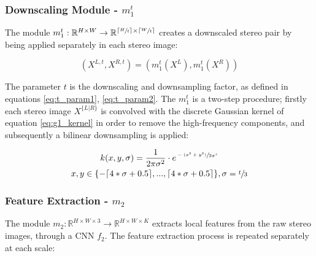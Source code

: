 \documentclass[runningheads]{llncs}
\begin{document}

\subsubsection{Downscaling Module - $m_1^t$}

The module $m_1^t: \mathbb{R}^{H \times W} \rightarrow \mathbb{R}^{\lceil \sfrac{H}{t} \rceil \times \lceil \sfrac{W}{t} \rceil }$ creates a downscaled stereo pair by being applied separately in each stereo image: 

\begin{equation} \label{eq:g1}
    (X^{L,t}, X^{R,t}) = (m_1^t(X^L), m_1^t(X^R))
\end{equation}{}

The parameter $t$ is the downscaling and downsampling factor, as defined in equations \ref{eq:t_param1}, \ref{eq:t_param2}. The $m_1^t$ is a two-step procedure; firstly each stereo image $X^{\{L|R\}}$ is convolved with the discrete Gaussian kernel of equation \ref{eq:g1_kernel} in order to remove the high-frequency components, and subsequently a bilinear downsampling is applied:

\begin{gather} \label{eq:g1_kernel}
    k(x, y, \sigma) = \frac{1}{2\pi\sigma^2} \cdot e^{\sfrac{-(x^2 + y^2)}{2\sigma^2}} \\
    x,y \in \{-\lceil 4*\sigma + 0.5 \rceil, ..., \lceil 4*\sigma + 0.5 \rceil\}, \sigma = \sfrac{t}{3}
\end{gather}

\subsubsection{Feature Extraction - $m_2$}

The module $m_2: \mathbb{R}^{H \times W \times 3} \rightarrow \mathbb{R}^{H \times W \times K}$ extracts local features from the raw stereo images, through a CNN $f_2$. The feature extraction process is repeated separately at each scale:
\end{document}
